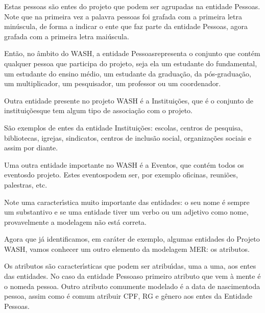 \documentclass[
12pt,		%
openright,	%
twoside,  %
a4paper,			%
chapter=TITLE,		%
english,			%
french,				%
spanish,			%
brazil				%
]{USPSC-classe/USPSC}
\begin{document}
Estas pessoas s\~ao entes do projeto que podem ser agrupadas na entidade \textquotedbl Pessoas\textquotedbl . Note que na primeira vez a palavra pessoas foi grafada com a primeira letra min\'uscula, de forma a indicar o ente que faz parte da entidade \textquotedbl Pessoas\textquotedbl , agora grafada com a primeira letra mai\'uscula.


Ent\~ao, no \^ambito do WASH, a entidade \textquotedbl Pessoas\textquotedbl  representa o conjunto que cont\'em qualquer pessoa que participa do projeto, seja ela um estudante do fundamental, um estudante do ensino m\'edio, um estudante da gradua\c{c}\~ao, da p\'os-gradua\c{c}\~ao, um multiplicador, um pesquisador, um professor ou um coordenador.


Outra entidade presente no projeto WASH \'e a \textquotedbl Institui\c{c}\~oes\textquotedbl , que \'e o conjunto de \textquotedbl institui\c{c}\~oes\textquotedbl  que tem algum tipo de associa\c{c}\~ao com o projeto.


S\~ao exemplos de entes da entidade \textquotedbl Institui\c{c}\~oes\textquotedbl : escolas, centros de pesquisa, bibliotecas, igrejas, sindicatos, centros de inclus\~ao social, organiza\c{c}\~oes sociais e assim por diante.


Uma outra entidade importante no WASH \'e a \textquotedbl Eventos\textquotedbl , que cont\'em todos os \textquotedbl eventos\textquotedbl  do projeto. Estes \textquotedbl eventos\textquotedbl  podem ser, por exemplo \textquotedbl oficinas\textquotedbl , \textquotedbl reuni\~oes\textquotedbl , \textquotedbl palestras\textquotedbl , etc.


Note uma caracter\'{\i}stica muito importante das entidades: o seu nome \'e sempre um substantivo e se uma entidade tiver um verbo ou um adjetivo como nome, provavelmente a modelagem n\~ao est\'a correta.



\noindent\begin{center}\mbox{\centering{}}\end{center}


Agora que j\'a identificamos, em car\'ater de exemplo, algumas entidades do Projeto WASH, vamos conhecer um outro elemento da modelagem MER: os atributos.


Os atributos s\~ao caracter\'{\i}sticas que podem ser atribu\'{\i}das, uma a uma, aos entes das entidades. No caso da entidade \textquotedbl Pessoas\textquotedbl  o primeiro atributo que vem \`a mente \'e o \textquotedbl nome\textquotedbl  da pessoa. Outro atributo comumente modelado \'e a \textquotedbl data de nascimento\textquotedbl  da pessoa, assim como \'e comum atribuir CPF, RG e g\^enero aos entes da Entidade \textquotedbl Pessoas\textquotedbl .
\end{document}
